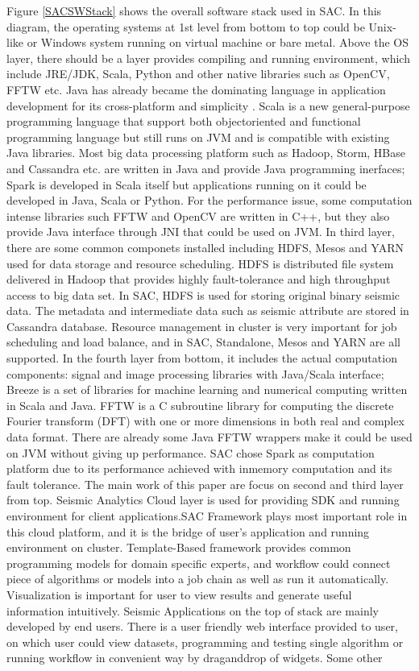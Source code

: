 Figure \ref{SACSWStack} shows the overall software stack used in SAC. In this diagram, the operating systems at 1st level from bottom to top could be Unix-like or Windows system running on virtual machine or bare metal. Above the OS layer, there should be a layer provides compiling and running environment, which include JRE/JDK, Scala, Python and other native libraries such as OpenCV, FFTW etc. Java has already became the dominating language in application development for its cross-platform and simplicity \cite{Top10Lang}. Scala is a new general-purpose programming language that support both object\-oriented and functional programming language but still runs on JVM and is compatible with existing Java libraries. Most big data processing platform such as Hadoop, Storm, HBase and Cassandra etc. are written in Java and provide Java programming inerfaces; Spark is developed in Scala itself but applications running on it could be developed in Java, Scala or Python. For the performance issue, some computation intense libraries such FFTW and OpenCV are written in C++, but they also provide Java interface through JNI that could be used on JVM. In third layer, there are some common componets installed including HDFS, Mesos \cite{ApacheMesos} and YARN \cite{ApacheHadoop}  used for data storage and resource scheduling. HDFS is distributed file system delivered in Hadoop that provides highly fault-tolerance and high throughput access to big data set. In SAC, HDFS is used for storing original binary seismic data. The metadata and intermediate data such as seismic attribute are stored in Cassandra database. Resource management in cluster is very important for job scheduling and load balance, and in SAC, Standalone, Mesos and YARN are all supported. In the fourth layer from bottom, it includes the actual computation components: signal and image processing libraries with Java/Scala interface; Breeze \cite{ScalaNLPBreeze} is a set of libraries for machine learning and numerical computing written in Scala and Java. FFTW \cite{Frigo05thedesign} is a C subroutine library for computing the discrete Fourier transform (DFT) with one or more dimensions in both real and complex data format. There are already some Java FFTW wrappers make it could be used on JVM without giving up performance. SAC chose Spark as computation platform due to its performance achieved with in\-memory computation and its fault tolerance. The main work of this paper are focus on second and third layer from top. Seismic Analytics Cloud layer is used for providing SDK and running environment for client applications.SAC Framework plays most important role in this cloud platform, and it is the bridge of user's application and running environment on cluster. Template-Based framework provides common programming models for domain specific experts, and workflow could connect piece of algorithms or models into a job chain as well as run it automatically. Visualization is important for user to view results and generate useful information intuitively. Seismic Applications on the top of stack are mainly developed by end users. There is a user friendly web interface provided to user, on which user could view datasets, programming and testing single algorithm or running workflow in convenient way by drag\-and\-drop of widgets. Some other 